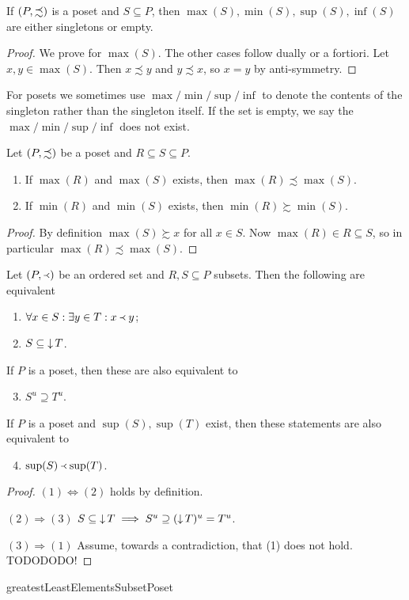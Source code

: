 \begin{lemma} \label{minMaxSingletons}
If $\left( P, \precsim \right)$ is a poset and $S\subseteq P$, then $\max(S), \min(S), \sup(S), \inf(S)$ are either singletons or empty.
\end{lemma}
\begin{proof}
We prove for $\max(S)$. The other cases follow dually or a fortiori. Let $x,y\in \max(S)$. Then $x\precsim y$ and $y\precsim x$, so $x=y$ by anti-symmetry.
\end{proof}
For posets we sometimes use $\max/\min/\sup/\inf$ to denote the contents of the singleton rather than the singleton itself. If the set is empty, we say the $\max/\min/\sup/\inf$ does not exist.

\begin{lemma} \label{greatestLeastElementsSubsetPoset}
Let $\left( P, \precsim \right)$ be a poset and $R\subseteq S\subseteq P$.
\begin{enumerate}
\item If $\max(R)$ and $\max(S)$ exists, then $\max(R) \precsim \max(S)$.
\item If $\min(R)$ and $\min(S)$ exists, then $\min(R) \succsim \min(S)$.
\end{enumerate}
\end{lemma}
\begin{proof}
By definition $\max(S) \succsim x$ for all $x \in S$. Now $\max(R)\in R\subseteq S$, so in particular $\max(R) \precsim \max(S)$.
\end{proof}

\begin{lemma}
Let $\left( P, \Yleft \right)$ be an ordered set and $R,S \subseteq P$ subsets. Then the following are equivalent
\begin{enumerate}
\item $\forall x\in S: \exists y\in T: x \Yleft y$;
\item $S \subseteq \mathop{\downarrow} T$.
\end{enumerate}
If $P$ is a poset, then these are also equivalent to
\begin{enumerate} \setcounter{enumi}{2}
\item $S^u \supseteq T^u$.
\end{enumerate}
If $P$ is a poset and $\sup(S), \sup(T)$ exist, then these statements are also equivalent to
\begin{enumerate} \setcounter{enumi}{3}
\item $\sup(S) \Yleft \sup(T)$.
\end{enumerate}
\end{lemma}
\begin{proof}
$(1) \Leftrightarrow (2)$ holds by definition.

$(2) \Rightarrow (3)$ $S \subseteq \mathop{\downarrow} T \implies S^u \supseteq (\mathop{\downarrow} T)^u = T^u$.

$(3) \Rightarrow (1)$ Assume, towards a contradiction, that (1) does not hold. TODODODO!
\end{proof}
{greatestLeastElementsSubsetPoset}


